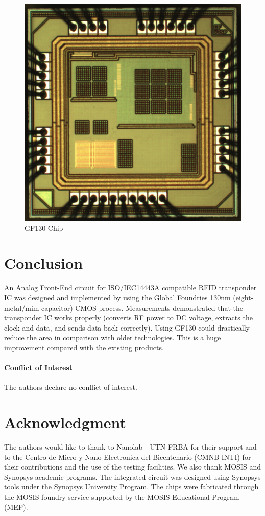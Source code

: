 \documentclass{article} %
\begin{document}
\begin{multicols}{2}
\begin{figure}[H]
    \centering
    \includegraphics[width=0.5\linewidth]{Images/ImagenesTesina/chip_130.png}
    \caption{GF130 Chip}
    \label{fig:chip GF130}
\end{figure}


\section{Conclusion}
An Analog Front-End circuit for ISO/IEC14443A compatible
RFID transponder IC was designed and implemented by using
the Global Foundries 130nm (eight-metal/mim-capacitor)
CMOS process. Measurements demonstrated that the
transponder IC works properly (converts RF power to DC
voltage, extracts the clock and data, and  sends data back correctly). Using GF130 could drastically reduce the area
in comparison with older technologies. This is a huge
improvement compared with the existing products.

\paragraph{Conflict of Interest}

The authors declare no conflict of interest.

\section{Acknowledgment}
The authors would like to thank to Nanolab - UTN FRBA for their support and to the Centro de Micro y Nano Electronica del Bicentenario (CMNB-INTI) \cite{inti} for their contributions and the use of the testing facilities. We also thank MOSIS and Synopsys academic programs. The integrated circuit was designed using Synopsys \cite{synopsys} tools under the Synopsys University Program. The chips were fabricated through the MOSIS foundry service supported by the MOSIS Educational Program (MEP).



\end{multicols}
\end{document}
